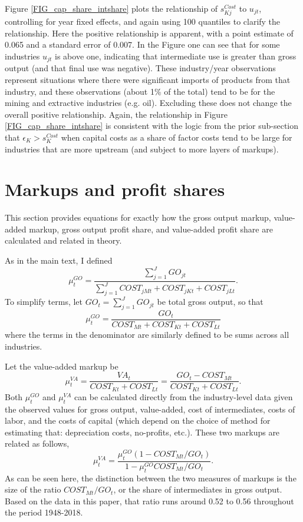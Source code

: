 \documentclass[11pt]{article}
\begin{document}
Figure \ref{FIG_cap_share_intshare} plots the relationship of $s_{Kj}^{Cost}$ to $u_{jt}$, controlling for year fixed effects, and again using 100 quantiles to clarify the relationship. Here the positive relationship is apparent, with a point estimate of 0.065 and a standard error of 0.007. In the Figure one can see that for some industries $u_{jt}$ is above one, indicating that intermediate use is greater than gross output (and that final use was negative). These industry/year observations represent situations where there were significant imports of products from that industry, and these observations (about 1\% of the total) tend to be for the mining and extractive industries (e.g. oil). Excluding these does not change the overall positive relationship. Again, the relationship in Figure \ref{FIG_cap_share_intshare} is consistent with the logic from the prior sub-section that $\epsilon_K > s_K^{Cost}$ when capital costs as a share of factor costs tend to be large for industries that are more upstream (and subject to more layers of markups). 

\section{Markups and profit shares}
This section provides equations for exactly how the gross output markup, value-added markup, gross output profit share, and value-added profit share are calculated and related in theory.

As in the main text, I defined
\begin{equation}
    \mu^{GO}_{t} = \frac{\sum_{j=1}^{J} GO_{jt}}{\sum_{j=1}^J COST_{jMt} + COST_{jKt} + COST_{jLt}}.
\end{equation}
To simplify terms, let $GO_t = \sum_{j=1}^{J} GO_{jt}$ be total gross output, so that
\begin{equation}
	\mu^{GO}_t = \frac{GO_t}{COST_{Mt} + COST_{Kt} + COST_{Lt}}
\end{equation}
where the terms in the denominator are similarly defined to be sums across all industries. 

Let the value-added markup be
\begin{equation}
	\mu^{VA}_t = \frac{VA_t}{COST_{Kt}+COST_{Lt}} = \frac{GO_t-COST_{Mt}}{COST_{Kt} + COST_{Lt}}.
\end{equation}
Both $\mu_t^{GO}$ and $\mu_t^{VA}$ can be calculated directly from the industry-level data given the observed values for gross output, value-added, cost of intermediates, costs of labor, and the costs of capital (which depend on the choice of method for estimating that: depreciation costs, no-profits, etc.). These two markups are related as follows, 
\begin{equation}
	\mu^{VA}_t = \frac{\mu^{GO}_t(1-COST_{Mt}/GO_t)}{1-\mu^{GO}_tCOST_{Mt}/GO_t}.
\end{equation}
As can be seen here, the distinction between the two measures of markups is the size of the ratio $COST_{Mt}/GO_t$, or the share of intermediates in gross output. Based on the data in this paper, that ratio runs around 0.52 to 0.56 throughout the period 1948-2018.
\end{document}

